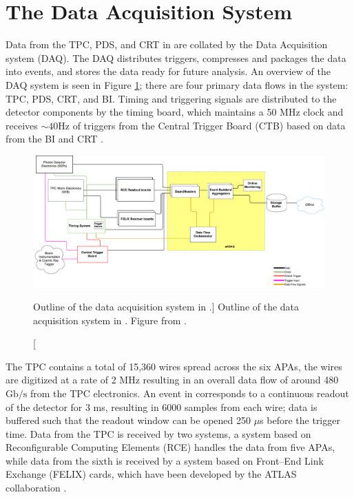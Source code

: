 \section{The Data Acquisition System}

Data from the TPC, PDS, and CRT in \protodune{} are collated by the Data 
Acquisition system (DAQ). The DAQ distributes triggers, compresses and packages 
the data into events, and stores the data ready for future analysis. 
An overview of the \protodune{} DAQ system is seen in Figure 
\ref{fig:pdsp_daq}; there are four primary data flows in the system: TPC, PDS, 
CRT, and BI. Timing and triggering signals are distributed to the detector 
components by the timing board, which maintains a 50 MHz clock and receives 
$\sim 40 \mbox{Hz}$ of triggers from the Central Trigger Board (CTB) based on 
data from the BI and CRT \cite{Abi2017}.

\begin{figure}

	\centering

	\includegraphics[width=\textwidth]{figures/pdsp_daq.pdf}

	\caption
	[Outline of the data acquisition system in \protodune{}.]
	{Outline of the data acquisition system in \protodune{}. Figure from
	\cite{Abi2017}.}

	\label{fig:pdsp_daq}

\end{figure}

The \protodune{} TPC contains a total of 15,360 wires spread across the six
APAs, the wires are digitized at a rate of 2 MHz resulting in an overall data
flow of around 480 $\mbox{Gb/s}$ from the TPC electronics. An event in
\protodune{} corresponds to a continuous readout of the detector for 3 ms,
resulting in 6000 samples from each wire; data is buffered such that the readout
window can be opened 250 $\mu$s before the trigger time. Data from the TPC is
received by two systems, a system based on Reconfigurable Computing Elements
(RCE) \cite{7431254} handles the data from five APAs, while data from the sixth 
is received by a system based on Front--End Link Exchange (FELIX) cards, which 
have been developed by the ATLAS collaboration \cite{Anderson_2016}.

